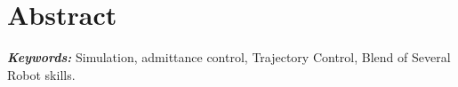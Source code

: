 \documentclass[Setup/main.tex]{subfiles}
\begin{document}
\section*{Abstract}      



\hspace{10pt}

\providecommand{\keywords}[1] {
  \small	
  \textbf{\textit{Keywords: }} #1
}
\keywords{Simulation, admittance control, Trajectory Control, Blend of Several Robot skills.}
\end{document}
